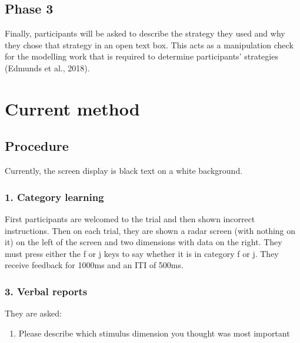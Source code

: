 \documentclass[doc, a4paper, apacite]{apa6}
\begin{document}
\subsection{Phase 3}
Finally, participants will be asked to describe the strategy they used and why they chose that strategy in an open text box. This acts as a manipulation check for the modelling work that is required to determine participants’ strategies (Edmunds et al., 2018). 

\section{Current method}

\subsection{Procedure}
Currently, the screen display is black text on a white background.
\subsubsection{1. Category learning}
First participants are welcomed to the trial and then shown incorrect instructions. 
Then on each trial, they are shown a radar screen (with nothing on it) on the left of the screen and two dimensions with data on the right. 
They must press either the f or j keys to say whether it is in category f or j. 
They receive feedback for 1000ms and an ITI of 500ms. 

\subsubsection{3. Verbal reports}
They are asked:
\begin{enumerate}
	\item Please describe which stimulus dimension you thought was most important \\
\end{enumerate}
\end{document}
